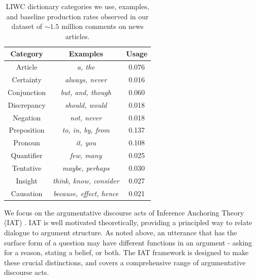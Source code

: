 \documentclass[11pt,a4paper]{article}
\begin{document}
\begin{table}[t]
\begin{center}
\small
\begin{tabular}{|c|c|c|}
\hline
Category & Examples & Usage \\
\hline
Article & \textit{a, the} & 0.076 \\
Certainty & \textit{always, never} & 0.016 \\
Conjunction & \textit{but, and, though} & 0.060 \\
Discrepancy & \textit{should, would} & 0.018 \\
Negation & \textit{not, never} & 0.018 \\
Preposition & \textit{to, in, by, from} & 0.137 \\
Pronoun & \textit{it, you} & 0.108 \\
Quantifier & \textit{few, many} & 0.025 \\
Tentative & \textit{maybe, perhaps} & 0.030 \\
Insight & \textit{think, know, consider} & 0.027 \\
Causation & \textit{because, effect, hence} & 0.021 \\
\hline
\end{tabular}
\end{center}
\caption{LIWC dictionary categories we use, examples, and baseline production rates observed in our dataset of $\sim1.5$ million comments on news articles.}
\end{table}

We focus on the argumentative discourse acts of Inference Anchoring Theory (IAT) \cite{BudzynskaR11, BudzynskaJRS16}. IAT is well motivated theoretically, providing a principled way to relate dialogue to argument structure. As noted above, an utterance that has the surface form of a question may have different functions in an argument - asking for a reason, stating a belief, or both. The IAT framework is designed to make these crucial distinctions, and covers a comprehensive range of argumentative discourse acts.
\end{document}
